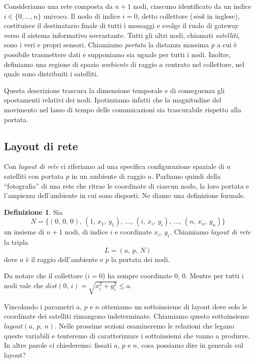 \documentclass[a4paper,11pt]{article}
\theoremstyle{definition}
\newtheorem{definition}{Definizione}
\begin{document}
Consideriamo una rete composta da $n+1$ nodi, ciascuno identificato da un indice $i \in \{0, \dots, n\}$ univoco. Il nodo di indice $i=0$, detto collettore (\emph{sink} in inglese), costituisce il destinatario finale di tutti i messaggi e svolge il ruolo di gateway verso il sistema informativo sovrastante. Tutti gli altri nodi, chiamati \emph{satelliti}, sono i veri e propri sensori. Chiamiamo \emph{portata} la distanza massima $p$ a cui è possibile trasmettere dati e supponiamo sia uguale per tutti i nodi. Inoltre, definiamo una regione di spazio \emph{ambiente} di raggio $a$ centrato nel collettore, nel quale sono distribuiti i satelliti.

Questa descrizione trascura la dimensione temporale e di conseguenza gli spostamenti relativi dei nodi. Ipotizziamo infatti che la magnitudine del movimento nel lasso di tempo delle comunicazioni sia trascurabile rispetto alla portata.

\subsection{Layout di rete}

Con \emph{layout di rete} ci riferiamo ad una specifica configurazione spaziale di $n$ satelliti con portata $p$ in un ambiente di raggio $a$. Parliamo quindi della ``fotografia'' di una rete che ritrae le coordinate di ciascun nodo, la loro portata e l'ampiezza dell'ambiente in cui sono disposti. Ne diamo una definizione formale.

\begin{definition}
Sia
\begin{equation*}
N = \{(0,\,0,\,0),\,(1,\,x_1,\,y_1),\,\dots,\,(i,\,x_i,\,y_i),\,\dots,\,(n,\,x_n,\,y_n)\}
\end{equation*}
un insieme di $n+1$ nodi, di indice $i$ e coordinate $x_i,\,y_i$. Chiamiamo \emph{layout di rete} la tripla
\begin{equation*}
L = (a,\,p,\,N)
\end{equation*}
dove $a$ è il raggio dell'ambiente e $p$ la portata dei nodi.
\end{definition}

Da notare che il collettore ($i=0$) ha sempre coordinate $0,\,0$. Mentre per tutti i nodi vale che $dist(0,\,i) = \sqrt{x_i^2+y_i^2} \leq a$.

Vincolando i parametri $a$, $p$ e $n$ otteniamo un sottoinsieme di layout dove solo le coordinate dei satelliti rimangono indeterminate. Chiamiamo questo sottoinsieme $layout(a,\,p,\,n)$. Nelle prossime sezioni esamineremo le relazioni che legano queste variabili e tenteremo di caratterizzare i sottoinsiemi che vanno a produrre. In altre parole ci chiederemo: fissati $a$, $p$ e $n$, cosa possiamo dire in generale sul layout?
\end{document}
